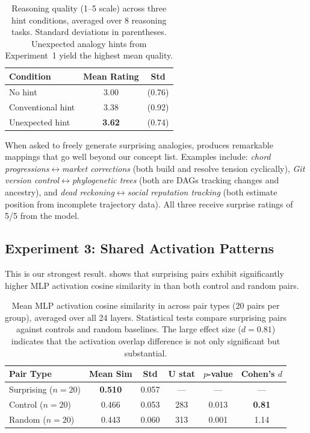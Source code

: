 \begin{table}[t]
    \centering
    \caption{Reasoning quality (1--5 scale) across three hint conditions, averaged over 8 reasoning tasks. Standard deviations in parentheses. Unexpected analogy hints from Experiment~1 yield the highest mean quality.}
    \begin{tabular}{@{}lcc@{}}
        \toprule
        \textbf{Condition} & \textbf{Mean Rating} & \textbf{Std} \\
        \midrule
        No hint & 3.00 & (0.76) \\
        Conventional hint & 3.38 & (0.92) \\
        Unexpected hint & \textbf{3.62} & (0.74) \\
        \bottomrule
    \end{tabular}
    \label{tab:reasoning}
\end{table}

When asked to freely generate surprising analogies, \gptfour produces remarkable mappings that go well beyond our concept list.
Examples include: \emph{chord progressions}$\leftrightarrow$\emph{market corrections} (both build and resolve tension cyclically), \emph{Git version control}$\leftrightarrow$\emph{phylogenetic trees} (both are DAGs tracking changes and ancestry), and \emph{dead reckoning}$\leftrightarrow$\emph{social reputation tracking} (both estimate position from incomplete trajectory data).
All three receive surprise ratings of 5/5 from the model.

\subsection{Experiment 3: Shared Activation Patterns}
\label{sec:results_exp3}

This is our strongest result.
 shows that surprising pairs exhibit significantly higher MLP activation cosine similarity in \pythia than both control and random pairs.

\begin{table}[t]
    \centering
    \caption{Mean MLP activation cosine similarity in \pythia across pair types (20 pairs per group), averaged over all 24 layers. Statistical tests compare surprising pairs against controls and random baselines. The large effect size ($d = 0.81$) indicates that the activation overlap difference is not only significant but substantial.}
    \begin{tabular}{@{}lccccc@{}}
        \toprule
        \textbf{Pair Type} & \textbf{Mean Sim} & \textbf{Std} & \textbf{U stat} & \textbf{$p$-value} & \textbf{Cohen's $d$} \\
        \midrule
        Surprising ($n=20$) & \textbf{0.510} & 0.057 & --- & --- & --- \\
        Control ($n=20$) & 0.466 & 0.053 & 283 & 0.013 & \textbf{0.81} \\
        Random ($n=20$) & 0.443 & 0.060 & 313 & 0.001 & 1.14 \\
        \bottomrule
    \end{tabular}
    \label{tab:activations}
\end{table}

